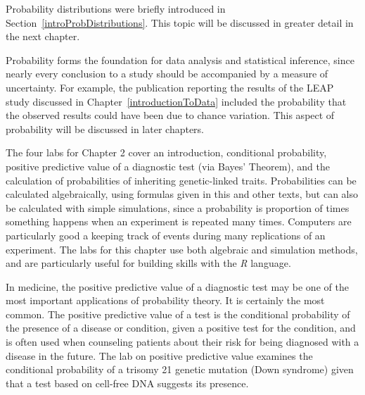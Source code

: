 Probability distributions were briefly introduced in Section~\ref{introProbDistributions}. This topic will be discussed in greater detail in the next chapter.

Probability forms the foundation for data analysis and statistical inference, since nearly every conclusion to a study should be accompanied by a measure of uncertainty. For example, the publication reporting the results of the LEAP study discussed in Chapter~\ref{introductionToData} included the probability that the observed results could have been due to chance variation. This aspect of probability will be discussed in later chapters.

The four labs for Chapter 2 cover an introduction, conditional probability, positive predictive value of a diagnostic test (via Bayes' Theorem), and the calculation of probabilities of inheriting genetic-linked traits. Probabilities can be calculated algebraically, using formulas given in this and other texts, but can also be calculated with simple simulations, since a probability is proportion of times something happens when an experiment is repeated many times.  Computers are particularly good a keeping track of events during many replications of an experiment.  The labs for this chapter use both algebraic and simulation methods, and are particularly useful for building skills with the \textsl{R} language.

In medicine, the positive predictive value of a diagnostic test may be one of the most important applications of probability theory. It is certainly the most common. The positive predictive value of a test is the conditional probability of the presence of a disease or condition, given a positive test for the condition, and is often used when counseling patients about their risk for being diagnosed with a disease in the future.  The lab on positive predictive value examines the conditional probability of a trisomy 21 genetic mutation (Down syndrome) given that a test based on cell-free DNA suggests its presence.

